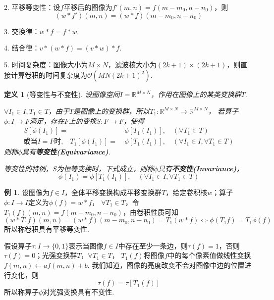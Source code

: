 \documentclass[12pt, a4paper, oneside]{ctexart}
\newtheorem{definition}{定义}
\numberwithin{equation}{section}  %
\theoremstyle{definition}
\newtheorem{example}{例}            %
\def\R{\mathbb{R}}          %
\def\O{\mathcal{O}}         %
\begin{document}
2. 平移等变性：设$f$平移后的图像为$f'(m,n) = f(m-m_0, n-n_0)$，则
\begin{equation*}
    (w*f')(m,n) = (w*f)(m-m_0,n-n_0)
\end{equation*}

3. 交换律：$w * f = f * w$.

4. 结合律：$v*(w*f) = (v*w)*f$.

5. 时间复杂度：图像大小为$M\times N$，滤波核大小为$(2k+1)\times(2k+1)$，则直接计算卷积的时间复杂度为$\O(MN(2k+1)^2)$.

\begin{definition}[等变性与不变性]
    设图像空间$I = \R^{M\times N}$，作用在图像上的某类变换群$T$.
    
    $\forall I_1\in I, T_1\in T$，由于$T$是图像上的变换群，所以$T_1:\R^{M\times N}\to \R^{M\times N}$，
    若算子$\phi:I\rightarrow F$满足，存在$F$上的变换$S:F\rightarrow F$，使得
    \begin{align*}
        S[\phi(I_1)] =&\ \phi[T_1(I_1)],\quad(\forall T_1\in T)\\
        \text{或当$I=F$时,}\quad T_1[\phi(I_1)] =&\ \phi[T_1(I_1)],\quad(\forall I_1\in I,\forall T_1\in T)
    \end{align*}
    则称$\phi$具有\textbf{等变性(Equivariance)}.

    等变性的特例，$S$为恒等变换时，下式成立，则称$\phi$具有\textbf{不变性(Invariance)}，
    \begin{equation*}
        \phi(I_1) = \phi[T_1(I_1)],\quad(\forall I_1\in I,\forall T_1\in T)
    \end{equation*}
\end{definition}
\begin{example}
    设图像为$f\in I$，全体平移变换构成平移变换群$T$，给定卷积核$w$；算子$\phi:I\to I$定义为$\phi(f) = w*f$，
    $\forall T_1\in T$，令$T_1(f)(m,n) = f(m-m_0,n-n_0)$，由卷积性质可知
    \begin{equation*}
        (w*T_1f)(m,n) = (w*f)(m-m_0,n-n_0)= T_1(w*f)\iff \phi(T_1f) = T_1\phi(f)
    \end{equation*}
    所以称卷积具有平移等变性.

    假设算子$\tau:I\to \{0,1\}$表示当图像$f\in I$中存在至少一条边，则$\tau(f) = 1$，否则$\tau(f) = 0$；光强变换群$T$，$\forall T_1\in T$，
    $T_1(f)$将图像$f$中的每个像素值做线性变换$f(m,n)\leftarrow af(m,n)+b$. 我们知道，图像的亮度改变不会对图像中边的位置进行变化，则
    \begin{equation*}
        \tau(f) = \tau[T_1(f)]
    \end{equation*}
    所以称算子$\phi$对光强变换具有不变性.
\end{example}
\end{document}
